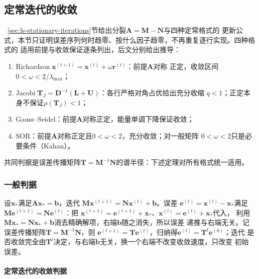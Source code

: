 \subsection{定常迭代的收敛}
\label{sec:ls-stationary-convergence}

~\ref{sec:ls-stationary-iterations}节给出分裂$\bm A=\bm M-\bm N$与四种定常格式的
更新公式，本节只证明误差序列何时趋零、按什么因子趋零，不再重复逐行实现。四种格式的
适用前提与收敛保证逐条列出，后文分别给出推导：
\begin{enumerate}
 \item Richardson$\;\bm x^{(t+1)}=\bm x^{(t)}+\omega\bm r^{(t)}$：前提$\bm A$对称
 正定，收敛区间$0<\omega<2/\lambda_{\max}$；
 \item Jacobi$\;\bm T_J=\bm D^{-1}(\bm L+\bm U)$：各行严格对角占优给出充分收缩
 $q<1$；正定本身不保证$\rho(\bm T_J)<1$；
 \item Gauss--Seidel：前提$\bm A$对称正定，能量单调下降保证收敛；
 \item SOR：前提$\bm A$对称正定且$0<\omega<2$，充分收敛；对一般矩阵
 $0<\omega<2$只是必要条件（Kahan）。
\end{enumerate}
共同判据是误差传播矩阵$\bm T=\bm M^{-1}\bm N$的谱半径：下述定理对所有格式统一适用。

\subsubsection{一般判据}

设$\bm x_*$满足$\bm A\bm x_*=\bm b$，迭代
$\bm M\bm x^{(t+1)}=\bm N\bm x^{(t)}+\bm b$。误差
$\bm e^{(t)}=\bm x^{(t)}-\bm x_*$满足$\bm M\bm e^{(t+1)}=\bm N\bm e^{(t)}$：把
$\bm x^{(t+1)}=\bm e^{(t+1)}+\bm x_*$、$\bm x^{(t)}=\bm e^{(t)}+\bm x_*$代入，
利用$\bm M\bm x_*=\bm N\bm x_*+\bm b$消去精确解项，右端$\bm b$随之消失，所以误差
递推与右端无关。记误差传播矩阵$\bm T=\bm M^{-1}\bm N$，则
$\bm e^{(t+1)}=\bm T\bm e^{(t)}$，归纳得$\bm e^{(t)}=\bm T^t\bm e^{(0)}$；迭代
是否收敛完全由$\bm T^t$决定，与右端$\bm b$无关，换一个右端不改变收敛速度，只改变
初始误差。

\paragraph{定常迭代的收敛判据}

